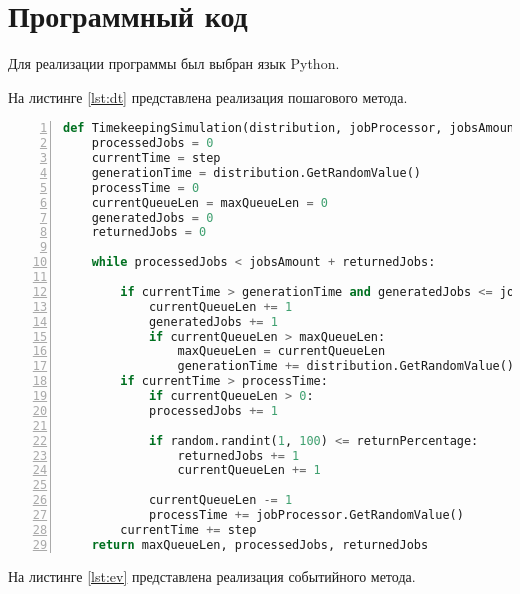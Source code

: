 \chapter{Программный код}

Для реализации программы был выбран язык Python. %

\noindent На листинге \ref{lst:dt} представлена реализация пошагового метода.
\begin{lstlisting}[language=Python,
    frame= tb,
    numbers=left,
    numberstyle=\footnotesize,
    caption={Релаизация пошагового метода},
    label={lst:dt}]
def TimekeepingSimulation(distribution, jobProcessor, jobsAmount=0, returnPercentage=0, step=0.001):
    processedJobs = 0
    currentTime = step
    generationTime = distribution.GetRandomValue()
    processTime = 0
    currentQueueLen = maxQueueLen = 0
    generatedJobs = 0
    returnedJobs = 0

    while processedJobs < jobsAmount + returnedJobs:

        if currentTime > generationTime and generatedJobs <= jobsAmount:
            currentQueueLen += 1
            generatedJobs += 1
            if currentQueueLen > maxQueueLen:
                maxQueueLen = currentQueueLen
                generationTime += distribution.GetRandomValue()
        if currentTime > processTime:
            if currentQueueLen > 0:
            processedJobs += 1

            if random.randint(1, 100) <= returnPercentage:
                returnedJobs += 1
                currentQueueLen += 1

            currentQueueLen -= 1
            processTime += jobProcessor.GetRandomValue()
        currentTime += step
    return maxQueueLen, processedJobs, returnedJobs
\end{lstlisting}
На листинге \ref{lst:ev} представлена реализация событийного метода. 

